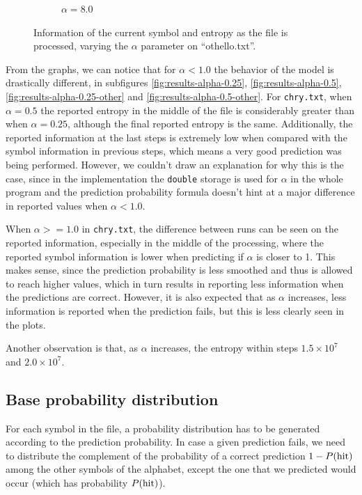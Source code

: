 \documentclass{article}
\begin{document}
\begin{figure}
\begin{subfigure}[b]{0.3\textwidth}
\begin{center}
        \end{center}
        \caption{$\alpha = 8.0$}
        \label{fig:results-alpha-other-8.0}
    \end{subfigure}
    \caption{Information of the current symbol and entropy as the file is processed, varying the $\alpha$ parameter on ``othello.txt''.}
    \label{fig:results-alpha-other}
\end{figure}

From the graphs, we can notice that for $\alpha < 1.0$ the behavior of the model is drastically different, in subfigures \ref{fig:results-alpha-0.25}, \ref{fig:results-alpha-0.5}, \ref{fig:results-alpha-0.25-other} and \ref{fig:results-alpha-0.5-other}.
For \verb|chry.txt|, when $\alpha = 0.5$ the reported entropy in the middle of the file is considerably greater than when $\alpha = 0.25$, although the final reported entropy is the same.
Additionally, the reported information at the last steps is extremely low when compared with the symbol information in previous steps, which means a very good prediction was being performed.
However, we couldn't draw an explanation for why this is the case, since in the implementation the \verb|double| storage is used for $\alpha$ in the whole program and the prediction probability formula doesn't hint at a major difference in reported values when $\alpha < 1.0$.

When $\alpha >= 1.0$ in \verb|chry.txt|, the difference between runs can be seen on the reported information, especially in the middle of the processing, where the reported symbol information is lower when predicting if $\alpha$ is closer to 1.
This makes sense, since the prediction probability is less smoothed and thus is allowed to reach higher values, which in turn results in reporting less information when the predictions are correct.
However, it is also expected that as $\alpha$ increases, less information is reported when the prediction fails, but this is less clearly seen in the plots.

Another observation is that, as $\alpha$ increases, the entropy within steps $1.5\times10^7$ and $2.0\times10^7$.

\subsection{Base probability distribution}

For each symbol in the file, a probability distribution has to be generated according to the prediction probability.
In case a given prediction fails, we need to distribute the complement of the probability of a correct prediction $1 - P(\textnormal{hit})$ among the other symbols of the alphabet, except the one that we predicted would occur (which has probability $P(\textnormal{hit})$).
\end{document}
